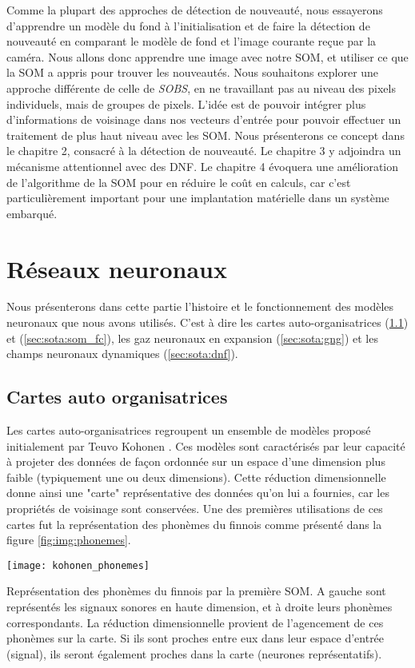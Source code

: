 	Comme la plupart des approches de détection de nouveauté, nous essayerons d'apprendre un modèle du fond à l'initialisation et de faire la détection de nouveauté en comparant le modèle de fond et l'image courante reçue par la caméra. Nous allons donc apprendre une image avec notre SOM, et utiliser ce que la SOM a appris pour trouver les nouveautés. Nous souhaitons explorer une approche différente de celle de \textit{SOBS}, en ne travaillant pas au niveau des pixels individuels, mais de groupes de pixels. L'idée est de pouvoir intégrer plus d'informations de voisinage dans nos vecteurs d'entrée pour pouvoir effectuer un traitement de plus haut niveau avec les SOM. Nous présenterons ce concept dans le chapitre 2, consacré à la détection de nouveauté. Le chapitre 3 y adjoindra un mécanisme attentionnel avec des DNF. Le chapitre 4 évoquera une amélioration de l'algorithme de la SOM pour en réduire le coût en calculs, car c'est particulièrement important pour une implantation matérielle dans un système embarqué.

\newpage
\section{Réseaux neuronaux}

Nous présenterons dans cette partie l'histoire et le fonctionnement des modèles neuronaux que nous avons utilisés. C'est à dire les cartes auto-organisatrices (\ref{sec:sota:som}) et (\ref{sec:sota:som_fc}), les gaz neuronaux en expansion (\ref{sec:sota:gng}) et les champs neuronaux dynamiques (\ref{sec:sota:dnf}).

\subsection{Cartes auto organisatrices}\label{sec:sota:som}

	Les cartes auto-organisatrices regroupent un ensemble de modèles proposé initialement par Teuvo Kohonen \cite{kohonen-som82}. Ces modèles sont caractérisés par leur capacité à projeter des données de façon ordonnée sur un espace d'une dimension plus faible (typiquement une ou deux dimensions). Cette réduction dimensionnelle donne ainsi une "carte" représentative des données qu'on lui a fournies, car les propriétés de voisinage sont conservées. Une des premières utilisations de ces cartes fut la représentation des phonèmes du finnois comme présenté dans la figure \ref{fig:img:phonemes}.

	\begin{figureth}
		\texttt{[image: kohonen\_phonemes]}
		\caption[Phonème SOM]{Représentation des phonèmes du finnois par la première SOM. A gauche sont représentés les signaux sonores en haute dimension, et à droite leurs phonèmes correspondants. La réduction dimensionnelle provient de l'agencement de ces phonèmes sur la carte. Si ils sont proches entre eux dans leur espace d'entrée (signal), ils seront également proches dans la carte (neurones représentatifs)\footnotemark .}\label{fig:img:phonemes}

	\end{figureth}

